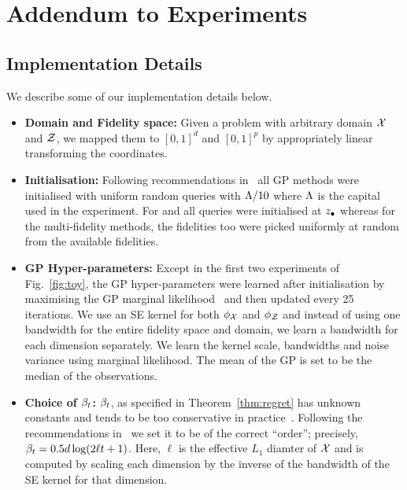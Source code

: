
\section{Addendum to Experiments}
\label{sec:appExperiments}

\subsection{Implementation Details}
\label{sec:appIimplementation}

We describe some of our implementation details below.
\begin{itemize}[leftmargin=0.0in]
\vspace{-0.05in}
\item[]
\textbf{Domain and Fidelity space:}
Given a problem with arbitrary domain $\mathcal{X}$ and $\mathcal{Z}$, we mapped them to
$[0,1]^d$ and $[0,1]^p$ by appropriately linear transforming the coordinates.

\item[]
\textbf{Initialisation:}
Following recommendations in~\citet{brochu12bo}
all GP methods were initialised with uniform random
queries with $\Lambda/10$ where $\Lambda$ is the capital used in the experiment.
For \gpucbs and \gpeis all queries were initialised at $z_{\bullet}$ whereas
for the multi-fidelity methods, the fidelities too were picked uniformly at random from
the available fidelities.

\item[]
\textbf{GP Hyper-parameters:}
Except in the first two experiments of Fig.~\ref{fig:toy},
the GP hyper-parameters were learned after initialisation by maximising
the GP marginal likelihood~\citep{rasmussen06gps} and then updated every 25 iterations.
We use an SE kernel for both $\phi_{\mathcal{X}}$ and $\phi_{\mathcal{Z}}$ and
instead of using one bandwidth for the entire fidelity space and domain, we learn
a bandwidth for each dimension separately.
We learn the kernel scale, bandwidths and noise variance using marginal likelihood.
The mean of the GP is set to be the median of the observations.

\vspace{-0.05in}
\item[]
\textbf{Choice of $\beta_t$:} $\beta_t$, as specified in Theorem~\ref{thm:regret} has unknown constants and tends to be too conservative in practice~\citep{srinivas10gpbandits}.  Following the recommendations in~\citet{kandasamy15addBO} we  set it to be of
the correct ``order''; precisely, $\beta_t = 0.5d\log(2\ell t + 1)$. 
Here, $\ell$ is the effective $L_1$ diamter of $\mathcal{X}$ and is computed by scaling
each dimension by the inverse of the bandwidth of the SE kernel for that dimension.


\end{itemize}
